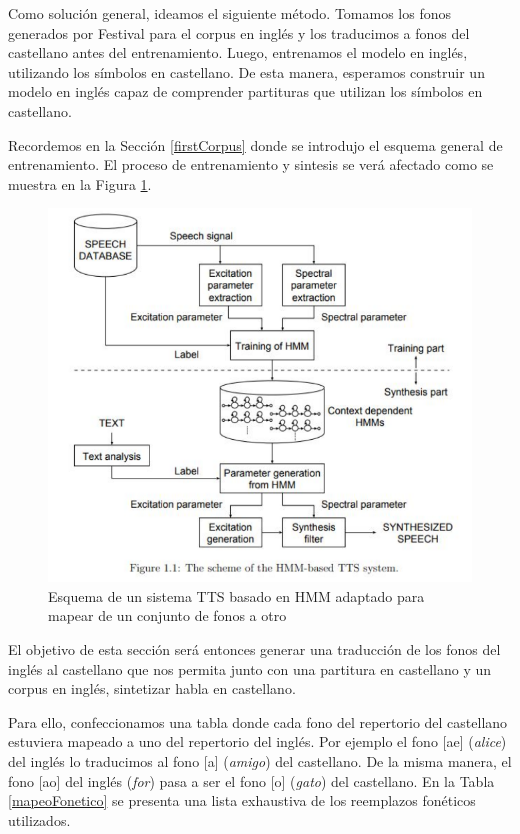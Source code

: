 Como solución general, ideamos el siguiente método. Tomamos los fonos generados por Festival para el corpus en inglés y los traducimos a fonos del castellano antes del entrenamiento. Luego, entrenamos el modelo en inglés, utilizando los símbolos en castellano. De esta manera, esperamos construir un modelo en inglés capaz de comprender partituras que utilizan los símbolos en castellano.

Recordemos en la Sección \ref{firstCorpus} donde se introdujo el esquema general de entrenamiento. El proceso de entrenamiento y sintesis se verá afectado como se muestra en la Figura \ref{pipelineAdapted}.

\begin{figure}
\includegraphics[scale=0.5]{imagenes/pipeline.png}
\caption{Esquema de un sistema TTS basado en HMM adaptado para mapear de un conjunto de fonos a otro}
\label{pipelineAdapted}
\centering
\end{figure}

El objetivo de esta sección será entonces generar una traducción de los fonos del inglés al castellano que nos permita junto con una partitura en castellano y un corpus en inglés, sintetizar habla en castellano.

Para ello, confeccionamos una tabla donde cada fono del repertorio del castellano estuviera mapeado a uno del repertorio del inglés. Por ejemplo el fono [ae] (\textit{alice}) del inglés lo traducimos al fono [a] (\textit{amigo}) del castellano. De la misma manera, el fono [ao] del inglés (\textit{for}) pasa a ser el fono [o] (\textit{gato}) del castellano. En la Tabla \ref{mapeoFonetico} se presenta una lista exhaustiva de los reemplazos fonéticos utilizados.

